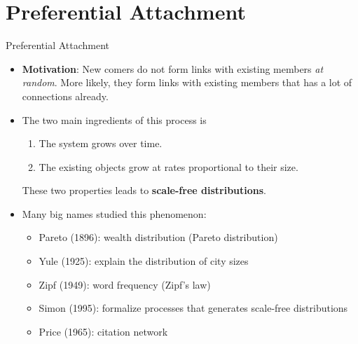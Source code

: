 \documentclass{beamer}
\begin{document}
\section{Preferential Attachment}

\begin{frame}{Preferential Attachment} %
	\begin{itemize}
		\item
			\textbf{Motivation}:
			New comers do not form links with existing members \emph{at random}.
			More likely, they form links with existing members that has a lot of connections already.
		\item
			The two main ingredients of this process is
			\begin{enumerate}
				\item The system grows over time.
				\item The existing objects grow at rates proportional to their size.
			\end{enumerate}
			These two properties leads to \textbf{scale-free distributions}.
		\item
			Many big names studied this phenomenon:
			\begin{itemize}
				\item Pareto (1896): wealth distribution (Pareto distribution)
				\item Yule (1925): explain the distribution of city sizes
				\item Zipf (1949): word frequency (Zipf's law)
				\item Simon (1995): formalize processes that generates scale-free distributions
				\item Price (1965): citation network
			\end{itemize}
	\end{itemize}
\end{frame}
\end{document}
